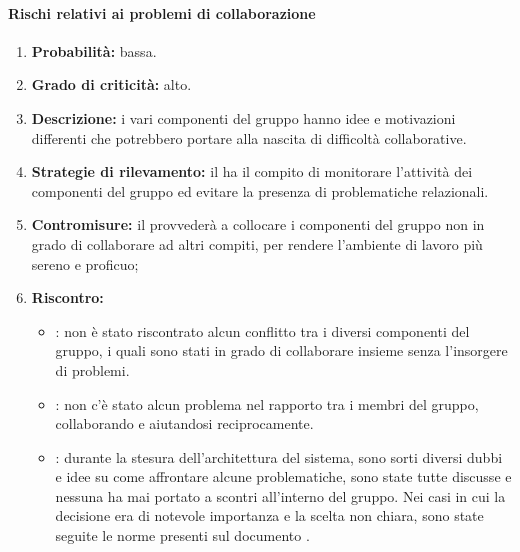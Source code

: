 \paragraph{Rischi relativi ai problemi di collaborazione}\mbox{}
\begin{enumerate}
	\item \textbf{Probabilità:} bassa.
	\item \textbf{Grado di criticità:} alto.
	\item \textbf{Descrizione:} i vari componenti del gruppo hanno idee e motivazioni differenti che potrebbero portare alla nascita di difficoltà collaborative.
	\item \textbf{Strategie di rilevamento:} il \Responsabile{} ha il compito di monitorare l’attività dei componenti del gruppo ed evitare la presenza di problematiche relazionali.
	\item \textbf{Contromisure:} il \Responsabile{} provvederà a collocare i componenti del gruppo non in grado di collaborare ad altri compiti, per rendere l’ambiente di lavoro più sereno e proficuo;
	\item \textbf{Riscontro:}
	\begin{itemize}
		\item \AR: non è stato riscontrato alcun conflitto tra i diversi componenti del gruppo, i quali sono stati in grado di collaborare insieme senza l'insorgere di problemi.
		\item \AD: non c'è stato alcun problema nel rapporto tra i membri del gruppo, collaborando e aiutandosi reciprocamente.
		\item \PA: durante la stesura dell'architettura del sistema, sono sorti diversi dubbi e idee su come affrontare alcune problematiche, sono state tutte discusse e nessuna ha mai portato a scontri all’interno del gruppo. Nei casi in cui la decisione era di notevole importanza e la scelta non chiara, sono state seguite le norme presenti sul documento \NormeDiProgetto{}.
	\end{itemize}
\end{enumerate}

